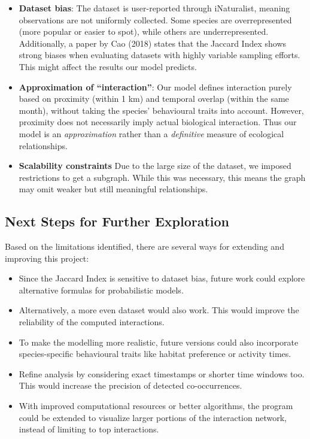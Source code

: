 \documentclass{article}
\begin{document}
\begin{itemize}
\item \textbf{Dataset bias}:
The dataset is user-reported through iNaturalist, meaning observations are not uniformly collected. Some species are overrepresented (more popular or easier to spot), while others are underrepresented. Additionally, a paper by Cao (2018) states that the Jaccard Index shows strong biases when evaluating datasets with highly variable sampling efforts. This might affect the results our model predicts.
\item \textbf{Approximation of “interaction”}:
Our model defines interaction purely based on proximity (within 1 km) and temporal overlap (within the same month), without taking the species' behavioural traits into account. However, proximity does not necessarily imply actual biological interaction. Thus our model is an \textit{approximation} rather than a \textit{definitive} measure of ecological relationships.
\item \textbf{Scalability constraints}
Due to the large size of the dataset, we imposed restrictions to get a subgraph. While this was necessary, this means the graph  may omit weaker but still meaningful relationships.
\end{itemize}

\subsection*{Next Steps for Further Exploration}
Based on the limitations identified, there are several ways for extending and improving this project:
\begin{itemize}
\item Since the Jaccard Index is sensitive to dataset bias, future work could explore alternative formulas for probabilistic models. 
\item Alternatively, a more even dataset would also work. This would improve the reliability of the computed interactions.
\item To make the modelling more realistic, future versions could also incorporate species-specific behavioural traits like habitat preference or activity times.
\item Refine analysis by considering exact timestamps or shorter time windows too. This would increase the precision of detected co-occurrences.
\item With improved computational resources or better algorithms, the program could be extended to visualize larger portions of the interaction network, instead of limiting to top interactions.
\end{itemize}
\end{document}
